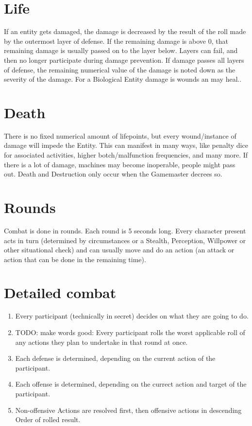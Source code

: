 \section{Life}\label{sec:life}
If an entity gets damaged, the damage is decreased by the result of the roll made by the outermost layer of defense.
If the remaining damage is above 0, that remaining damage is usually passed on to the layer below.
Layers can fail, and then no longer participate during damage prevention.
If damage passes all layers of defense,
the remaining numerical value of the damage is noted down as the severity of the damage.
For a Biological Entity damage is wounds an may heal..
\section{Death}\label{sec:death}
There is no fixed numerical amount of lifepoints, but every wound/instance of damage will impede the Entity.
This can manifest in many ways, like penalty dice for associated activities, higher botch/malfunction frequencies,
and many more.
If there is a lot of damage, machines may become inoperable, people might pass out.
Death and Destruction only occur when the Gamemaster decrees so.
\section{Rounds}\label{sec:rounds}
Combat is done in rounds.
Each round is 5 seconds long.
Every character present acts in turn (determined by circumstances or a Stealth, Perception, Willpower or other
situational check) and can usually move and do an action (an attack or action that can be done in the remaining time).
\section{Detailed combat}\label{sec:detailed-combat}
\begin{enumerate}
    \item Every participant (technically in secret) decides on what they are going to do.
    \item TODO: make words good: Every participant rolls the worst applicable roll of any actions they plan to undertake in that round at once.
    \item Each defense is determined, depending on the current action of the participant.
    \item Each offense is determined, depending on the currect action and target of the participant.
    \item Non-offensive Actions are resolved first, then offensive actions in descending Order of rolled result.
\end{enumerate}

